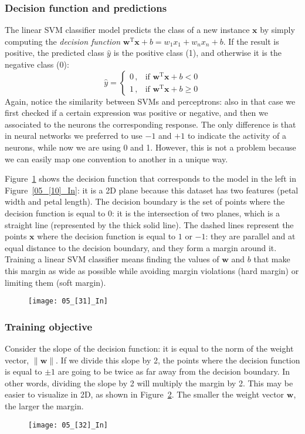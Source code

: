 \subsubsection{Decision function and predictions}
The linear SVM classifier model predicts the class of a new instance $\mathbf{x}$ by simply computing the \emph{decision function} $\mathbf{w}^{\mathrm{T}}\mathbf{x}+b=w_1x_1+w_nx_n+b$. If the result is positive, the predicted class $\widehat{y}$ is the positive class (1), and otherwise it is the negative class (0):
\begin{equation}
\widehat{y}=\begin{cases}
0\,,&\text{if $\mathbf{w}^{\mathrm{T}}\mathbf{x}+b<0$}\\
1\,,&\text{if $\mathbf{w}^{\mathrm{T}}\mathbf{x}+b\geq0$}
\end{cases}
\end{equation}
Again, notice the similarity between SVMs and perceptrons: also in that case we first checked if a certain expression was positive or negative, and then we associated to the neurons the corresponding response. The only difference is that in neural networks we preferred to use $-1$ and $+1$ to indicate the activity of a neurons, while now we are using 0 and 1. However, this is not a problem because we can easily map one convention to another in a unique way.

Figure~\ref{05_[31]_In} shows the decision function that corresponds to the model in the left in Figure~\ref{05_[10]_In}: it is a 2D plane because this dataset has two features (petal width and petal length). The decision boundary is the set of points where the decision function is equal to 0: it is the intersection of two planes, which is a straight line (represented by the thick solid line). The dashed lines represent the points $\mathbf{x}$ where the decision function is equal to $1$ or $-1$: they are parallel and at equal distance to the decision boundary, and they form a margin around it. Training a linear SVM classifier means finding the values of $\mathbf{w}$ and $b$ that make this margin as wide as possible while avoiding margin violations (hard margin) or limiting them (soft margin).
\begin{figure}[h!t]
\centering
\texttt{[image: 05\_[31]\_In]}
\caption{}\label{05_[31]_In}
\end{figure}
\subsubsection{Training objective}
Consider the slope of the decision function: it is equal to the norm of the weight vector, $\|\mathbf{w}\|$. If we divide this slope by 2, the points where the decision function is equal to $\pm1$ are going to be twice as far away from the decision boundary. In other words, dividing the slope by 2 will multiply the margin by 2. This may be easier to visualize in 2D, as shown in Figure~\ref{05_[32]_In}. The smaller the weight vector $\mathbf{w}$, the larger the margin.
\begin{figure}[h!t]
\centering
\texttt{[image: 05\_[32]\_In]}
\caption{}\label{05_[32]_In}
\end{figure}

